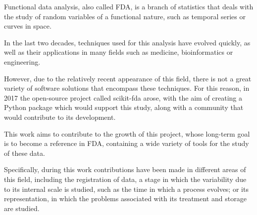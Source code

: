 Functional data analysis, also called FDA, is a branch of statistics that deals
with the study of random variables of a functional nature, such as temporal
series or curves in space.

In the last two decades, techniques used for this analysis have evolved quickly,
as well as their applications in many fields such as medicine, bioinformatics
or engineering.

However, due to the relatively recent appearance of this field, there is not a
great variety of software solutions that encompass these techniques. For this
reason, in 2017 the open-source project called scikit-fda arose, with the aim of
creating a Python package which would support this study, along with a
community that would contribute to its development.

This work aims to contribute to the growth of this project, whose long-term goal
is to become a reference in FDA, containing a wide variety of tools for the
study of these data.

Specifically, during this work contributions have been made in different areas
of this field, including the registration of data, a stage in which the
variability due to its internal scale is studied, such as the time in which a
process evolves; or its representation, in which the problems associated with
its treatment and storage are studied.
